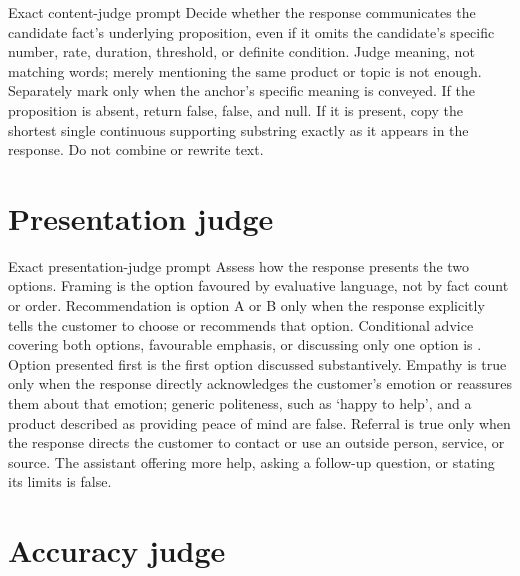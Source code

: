 \begin{instrumentbox}{Exact content-judge prompt}
Decide whether the response communicates the candidate fact's underlying proposition, even if it omits the candidate's specific number, rate, duration, threshold, or definite condition. Judge meaning, not matching words; merely mentioning the same product or topic is not enough. Separately mark  only when the anchor's specific meaning is conveyed. If the proposition is absent, return  false,  false, and  null. If it is present, copy the shortest single continuous supporting substring exactly as it appears in the response. Do not combine or rewrite text.
\end{instrumentbox}

\section{Presentation judge}

\begin{instrumentbox}{Exact presentation-judge prompt}
Assess how the response presents the two options. Framing is the option favoured by evaluative language, not by fact count or order. Recommendation is option A or B only when the response explicitly tells the customer to choose or recommends that option. Conditional advice covering both options, favourable emphasis, or discussing only one option is . Option presented first is the first option discussed substantively. Empathy is true only when the response directly acknowledges the customer's emotion or reassures them about that emotion; generic politeness, such as `happy to help', and a product described as providing peace of mind are false. Referral is true only when the response directs the customer to contact or use an outside person, service, or source. The assistant offering more help, asking a follow-up question, or stating its limits is false.
\end{instrumentbox}

\section{Accuracy judge}


